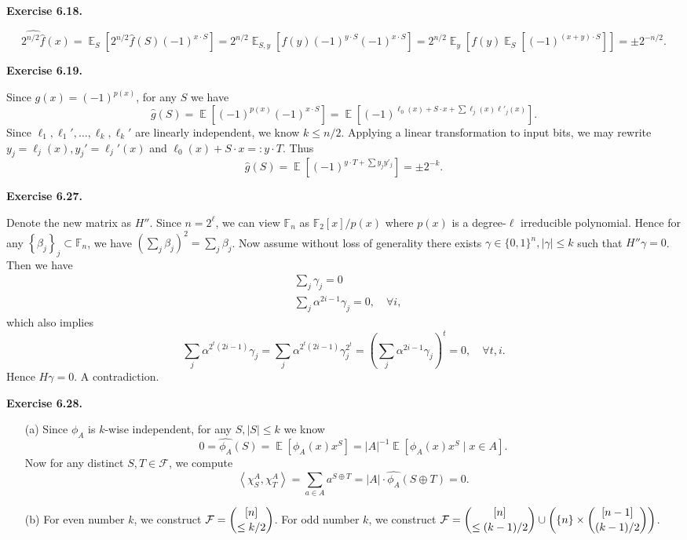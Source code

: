 \documentclass[a4paper]{article}
\newenvironment{exercise}[1]{
	\par
	\noindent\textbf{Exercise #1.}\quad
}{
	\par
	\bigskip
}
\DeclareMathOperator*{\E}{\mathbb E}
\newcommand{\abra}[1]{{\left\langle #1 \right\rangle}}
\newcommand{\pbra}[1]{{\left( #1 \right)}}
\newcommand{\cbra}[1]{{\left\{ #1 \right\}}}
\newcommand{\sbra}[1]{{\left[ #1 \right]}}
\newcommand{\bin}{{\{0,1\}}}
\newcommand{\Fbb}{\mathbb{F}}
\newcommand{\Fcal}{\mathcal{F}}
\begin{document}
\begin{exercise}{6.18}
    $$
    \widehat{2^{n/2}\hat f}(x)=\E_S\sbra{2^{n/2}\hat f(S)(-1)^{x\cdot S}}=2^{n/2}\E_{S,y}\sbra{f(y)(-1)^{y\cdot S}(-1)^{x\cdot S}}
    =2^{n/2}\E_y\sbra{f(y)\E_S\sbra{(-1)^{(x+y)\cdot S}}}
    =\pm2^{-n/2}.
    $$
\end{exercise}

\begin{exercise}{6.19}
    Since $g(x)=(-1)^{p(x)}$, for any $S$ we have
    $$
    \hat g(S)=\E\sbra{(-1)^{p(x)}(-1)^{x\cdot S}}=\E\sbra{(-1)^{\ell_0(x)+S\cdot x+\sum\ell_j(x)\ell'_j(x)}}.
    $$
    Since $\ell_1,\ell_1',\ldots,\ell_k,\ell_k'$ are linearly independent, we know $k\leq n/2$. 
    Applying a linear transformation to input bits, we may rewrite $y_j=\ell_j(x),y_j'=\ell_j'(x)$ and 
    $\ell_0(x)+S\cdot x=:y\cdot T$. Thus
    $$
    \hat g(S)=\E\sbra{(-1)^{y\cdot T+\sum y_jy'_j}}=\pm2^{-k}.
    $$
\end{exercise}

\begin{exercise}{6.27}
    Denote the new matrix as $H''$.
    Since $n=2^\ell$, we can view $\Fbb_n$ as $\Fbb_2[x]/p(x)$ where $p(x)$ is a degree-$\ell$ irreducible polynomial.
    Hence for any $\cbra{\beta_j}_j\subset\Fbb_n$, we have $\pbra{\sum_j\beta_j}^2=\sum_j\beta_j$.
    Now assume without loss of generality there exists $\gamma\in\bin^n,|\gamma|\leq k$ such that $H''\gamma=0$.
    Then we have
    \begin{align*}
        &\sum_j\gamma_j=0\\
        &\sum_j\alpha^{2i-1}\gamma_j=0,\quad\forall i,
    \end{align*}
    which also implies 
    $$
    \sum_j\alpha^{2^t(2i-1)}\gamma_j=
    \sum_j\alpha^{2^t(2i-1)}\gamma_j^{2^t}=
    \pbra{\sum_j\alpha^{2i-1}\gamma_j}^t=0,\quad\forall t,i.
    $$
    Hence $H\gamma=0$. A contradiction.
\end{exercise}

\begin{exercise}{6.28}
    \begin{itemize}
        \item[(a)] Since $\phi_A$ is $k$-wise independent, for any $S,|S|\leq k$ we know
            $$
            0=\hat{\phi_A}(S)=\E\sbra{\phi_A(x)x^S}=|A|^{-1}\E\sbra{\phi_A(x)x^S\mid x\in A}.
            $$
            Now for any distinct $S,T\in\Fcal$, we compute
            $$
            \abra{\chi_S^A,\chi_T^A}=\sum_{a\in A}a^{S\oplus T}=|A|\cdot \hat{\phi_A}(S\oplus T)=0.
            $$
        \item[(b)] For even number $k$, we construct $\Fcal=\dbinom{[n]}{\leq k/2}$. 
            For odd number $k$, we construct $\Fcal=\dbinom{[n]}{\leq (k-1)/2}\cup\pbra{\cbra{n}\times\dbinom{[n-1]}{(k-1)/2}}$.
    \end{itemize}
\end{exercise}
\end{document}
